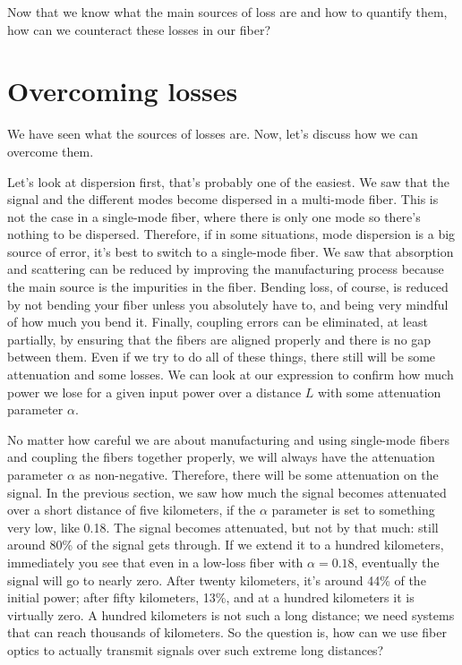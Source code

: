 Now that we know what the main sources of loss are and how to quantify them, how can we counteract these losses in our fiber?

\section{Overcoming losses}
\label{sec:11-4_overcoming_losses}

We have seen what the sources of losses are. Now, let's discuss how we can overcome them.

Let's look at dispersion first, that's probably one of the easiest. We saw that the signal and the different modes become dispersed in a multi-mode fiber. This is not the case in a single-mode fiber, where there is only one mode so there's nothing to be dispersed. Therefore, if in some situations, mode dispersion is a big source of error, it's best to switch to a single-mode fiber. We saw that absorption and scattering can be reduced by improving the manufacturing process because the main source is the impurities in the fiber. Bending loss, of course, is reduced by not bending your fiber unless you absolutely have to, and being very mindful of how much you bend it. Finally, coupling errors can be eliminated, at least partially, by ensuring that the fibers are aligned properly and there is no gap between them. Even if we try to do all of these things, there still will be some attenuation and some losses. We can look at  our expression to confirm how much power we lose for a given input power over a distance $L$ with some attenuation parameter $\alpha$.

No matter how careful we are about manufacturing and using single-mode fibers and coupling the fibers together properly, we will always have the attenuation parameter $\alpha$ as non-negative. Therefore, there will be some attenuation on the signal. In the previous section, we saw how much the signal becomes attenuated over a short distance of five kilometers, if the $\alpha$ parameter is set to something very low, like 0.18. The signal becomes attenuated, but not by that much: still around 80\% of the signal gets through. If we extend it to a hundred kilometers, immediately you see that even in a low-loss fiber with $\alpha = 0.18$, eventually the signal will go to nearly zero. After twenty kilometers, it's around 44\% of the initial power; after  fifty kilometers, 13\%, and at a hundred kilometers it is virtually zero. A hundred kilometers is not such a long distance; we need systems that can reach thousands of kilometers. So the question is, how can we use fiber optics to actually transmit signals over such extreme long distances?

